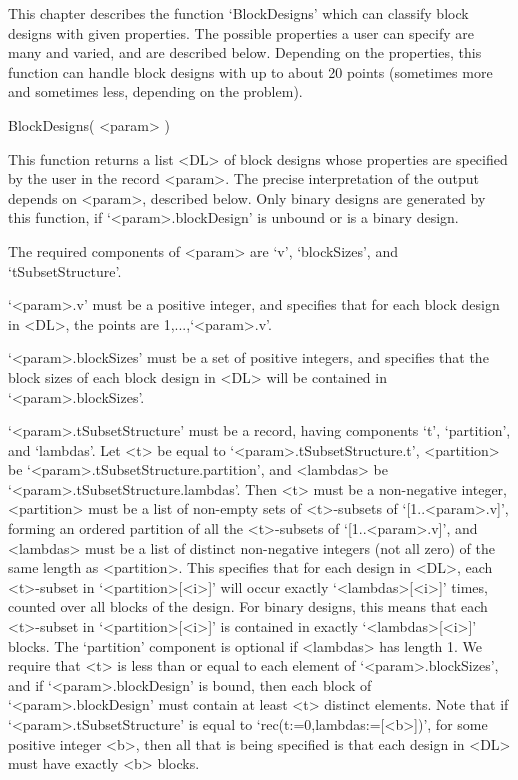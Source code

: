 %
%
%
%
\def\GRAPE{\sf GRAPE}
\def\DESIGN{\sf DESIGN}
\def\nauty{\it nauty}
\def\Aut{{\rm Aut}\,} 


This chapter describes the function `BlockDesigns' which can classify
block designs with given properties.  The possible properties a user
can specify are many and varied, and are described below. Depending on
the properties, this function can handle block designs with up to about
20 points (sometimes more and sometimes less, depending on the problem).


\>BlockDesigns( <param> )

This function returns a list <DL> of block designs whose properties are
specified by the user in the record <param>. The precise interpretation
of the output depends on <param>, described below. Only binary designs
are generated by this function, if `<param>.blockDesign' is unbound
or is a binary design.

The required components of <param> are `v', `blockSizes', and
`tSubsetStructure'.

`<param>.v' must be a positive integer, and specifies that for each block
design in <DL>, the points are 1,...,`<param>.v'.

`<param>.blockSizes' must be a set of positive integers, and specifies
that the block sizes of each block design in <DL> will be contained in
`<param>.blockSizes'.

`<param>.tSubsetStructure' must be a record, having
components `t', `partition', and `lambdas'. Let <t>
be equal to `<param>.tSubsetStructure.t', <partition>
be `<param>.tSubsetStructure.partition', and <lambdas> be
`<param>.tSubsetStructure.lambdas'.  Then <t> must be a non-negative
integer, <partition> must be a list of non-empty sets of <t>-subsets of
`[1..<param>.v]', forming an ordered partition of all the <t>-subsets of
`[1..<param>.v]', and <lambdas> must be a list of distinct non-negative
integers (not all zero) of the same length as <partition>. This specifies
that for each design in <DL>, each <t>-subset in `<partition>[<i>]'
will occur exactly `<lambdas>[<i>]' times, counted over all blocks of
the design.  For binary designs, this means that each <t>-subset in
`<partition>[<i>]' is contained in exactly `<lambdas>[<i>]' blocks.
The `partition' component is optional if <lambdas> has length 1.
We require that <t> is less than or equal to each element of
`<param>.blockSizes', and if `<param>.blockDesign' is bound,
then each block of `<param>.blockDesign' must contain at least <t>
distinct elements. Note that if `<param>.tSubsetStructure' is equal to
`rec(t:=0,lambdas:=[<b>])', for some positive integer <b>, then all
that is being specified is that each design in <DL> must have exactly
<b> blocks.

